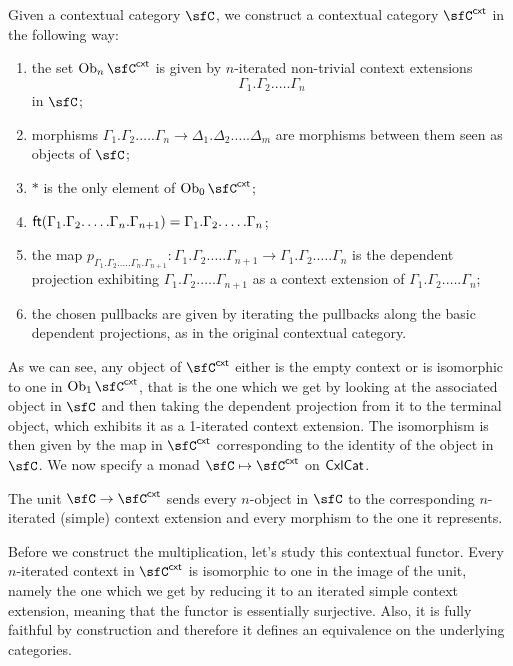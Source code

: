 \begin{construction}\cite[21]{Lum10}
  Given a contextual category $\sfC$, we construct a contextual category
  $\sfC^{\cxt}$ in the following way:
  \begin{enumerate}
    \item the set $\Ob_n\sfC^{\cxt}$ is given by $n$-iterated non-trivial context
      extensions
      \[\Gamma_1.\Gamma_2.\ldots.\Gamma_n\]
      in $\sfC$;
    \item morphisms
      $\Gamma_1.\Gamma_2.\ldots.\Gamma_n\rightarrow\Delta_1.\Delta_2.\ldots.\Delta_m$
      are morphisms between them seen as objects of $\sfC$;
    \item $*$ is the only element of $\Ob_0\sfC^{\cxt}$;
    \item
      $\operatorname{\mathsf{ft}}(\Gamma_1.\Gamma_2.\ldots.\Gamma_n.\Gamma_{n+1})=\Gamma_1.\Gamma_2.\ldots.\Gamma_n$;
    \item the map $p_{\Gamma_1.\Gamma_2.\ldots.\Gamma_n.\Gamma_{n+1}}\colon
      \Gamma_1.\Gamma_2.\ldots.\Gamma_{n+1}\rightarrow
      \Gamma_1.\Gamma_2.\ldots.\Gamma_n$ is the dependent projection exhibiting
      $\Gamma_1.\Gamma_2.\ldots.\Gamma_{n+1}$ as a context extension of
      $\Gamma_1.\Gamma_2.\ldots.\Gamma_n$;
    \item the chosen pullbacks are given by iterating the pullbacks along the
      basic dependent projections, as in the original contextual category.
  \end{enumerate}

  As we can see, any object of $\sfC^{\cxt}$ either is the empty context or is
  isomorphic to one in
  $\Ob_1\sfC^{\cxt}$, that is the one which we get by looking at the associated object
  in $\sfC$ and then taking the dependent projection from it to the terminal
  object, which exhibits it as a 1-iterated context extension. The isomorphism
  is then given by the map in $\sfC^{\cxt}$ corresponding to the identity of the
  object in $\sfC$. We now specify a monad $\sfC\mapsto\sfC^{\cxt}$ on $\operatorname{\mathsf{CxlCat}}$.

  The unit $\sfC\rightarrow\sfC^{\cxt}$ sends every $n$-object in $\sfC$ to
  the corresponding $n$-iterated (simple) context extension and every morphism
  to the one it represents.

  Before we construct the multiplication, let's study this contextual functor.
  Every $n$-iterated
  context in $\sfC^{\cxt}$ is isomorphic to one in the image of the unit, namely
  the one which we get by reducing it to an iterated simple context extension,
  meaning that the functor is essentially surjective. Also, it is fully faithful
  by construction and therefore it defines an equivalence on the underlying
  categories.


\end{construction}
